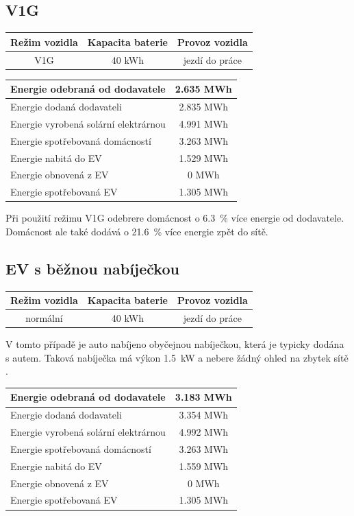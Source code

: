 \documentclass[12pt,a4paper]{article}
\begin{document}
\subsection{V1G}

\bigskip
\begin{tabular}{ | c | c | c | }
\hline
Režim vozidla & Kapacita baterie & Provoz vozidla \\
\hline
V1G & 40 kWh & jezdí do práce \\
\hline
\end{tabular}
\bigskip

\bigskip
\begin{tabular}{ | l | c | }
\hline
Energie odebraná od dodavatele & 2.635 MWh \\
\hline
Energie dodaná dodavateli & 2.835 MWh \\
\hline
Energie vyrobená solární elektrárnou & 4.991 MWh \\
\hline
Energie spotřebovaná domácností & 3.263 MWh \\
\hline
Energie nabitá do EV & 1.529 MWh \\
\hline
Energie obnovená z EV & 0 MWh \\
\hline
Energie spotřebovaná EV & 1.305 MWh \\
\hline
\end{tabular}
\bigskip

Při použití režimu V1G odebrere domácnost o 6.3~\% více energie od dodavatele.
Domácnost ale také dodává o 21.6~\% více energie zpět do sítě.

\subsection{EV s běžnou nabíječkou}

\bigskip
\begin{tabular}{ | c | c | c | }
\hline
Režim vozidla & Kapacita baterie & Provoz vozidla \\
\hline
normální & 40 kWh & jezdí do práce \\
\hline
\end{tabular}
\bigskip

V tomto případě je auto nabíjeno obyčejnou nabíječkou, která je typicky dodána s autem.
Taková nabíječka má výkon 1.5~kW a nebere žádný ohled na zbytek sítě \cite{Svarc-2022}.

\bigskip
\begin{tabular}{ | l | c | }
\hline
Energie odebraná od dodavatele & 3.183 MWh \\
\hline
Energie dodaná dodavateli & 3.354 MWh \\
\hline
Energie vyrobená solární elektrárnou & 4.992 MWh \\
\hline
Energie spotřebovaná domácností & 3.263 MWh \\
\hline
Energie nabitá do EV & 1.559 MWh \\
\hline
Energie obnovená z EV & 0 MWh \\
\hline
Energie spotřebovaná EV & 1.305 MWh \\
\hline
\end{tabular}
\bigskip
\end{document}
